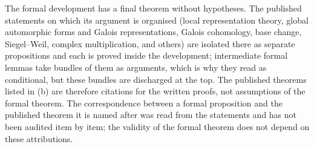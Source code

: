 \documentclass[10pt]{amsart}
\theoremstyle{definition}
\theoremstyle{remark}
\begin{document}
The formal development \cite{CharacterFamily} has a final theorem without
hypotheses. The published statements on which its argument is organised
(local representation theory, global automorphic forms and Galois
representations, Galois cohomology, base change, Siegel--Weil, complex
multiplication, and others) are isolated there as separate propositions and
each is proved inside the development; intermediate formal lemmas take
bundles of them as arguments, which is why they read as conditional, but
these bundles are discharged at the top. The published theorems listed in
(b) are therefore citations for the written proofs, not assumptions of the
formal theorem. The correspondence between a formal proposition and the
published theorem it is named after was read from the statements and has
not been audited item by item; the validity of the formal theorem does not
depend on these attributions.
\end{document}
